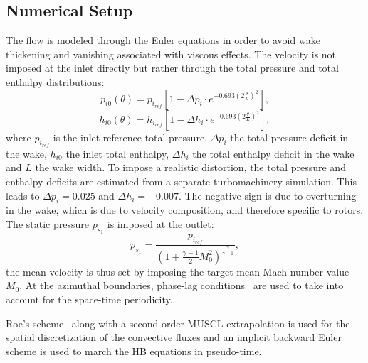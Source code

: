 \subsection{Numerical Setup}

The flow is modeled through the 
Euler equations in order to avoid wake thickening and vanishing
associated with viscous effects. 
The velocity is not imposed at the inlet directly
but rather through the total pressure and total enthalpy distributions:
\begin{equation}
  \label{eq:rotatingblocks_ptot}
    p_{i0} (\theta) = p_{i_{ref}} \left[1 - 
        \Delta p_i \cdot e^{
          -0.693 \left( 2 \frac{\theta}{L} \right) ^ 2}\right],
\end{equation}
\begin{equation}
  \label{eq:rotatingblocks_htot}
    h_{i0} (\theta) = h_{i_{ref}} \left[1- 
        \Delta h_i \cdot e^{
          -0.693 \left( 2 \frac{\theta}{L} \right) ^ 2}\right],
\end{equation}
where $p_{i_{ref}}$ is the inlet reference total pressure, $\Delta p_i$ the total pressure
deficit in the wake,
$h_{i0}$ the inlet total enthalpy, $\Delta h_i$ the total enthalpy
deficit in the wake and $L$ the wake width.
To impose a realistic distortion, the total pressure and
enthalpy deficits are estimated from a separate turbomachinery simulation.
This leads to $\Delta p_i = 0.025$ and 
$\Delta h_i = - 0.007$.
The negative sign is due to overturning in the wake, which
is due to velocity composition, and therefore specific to rotors.
The static pressure $p_{s_1}$ is imposed at the outlet:
\begin{equation}
    p_{s_1} = \frac{p_{i_{ref}}}{\left(1 + 
    \frac{\gamma - 1}{2} M_{0}^2 \right) ^ {\frac{\gamma}{ \gamma - 1}}} ,
\end{equation}
the mean velocity is thus set by imposing the
target mean Mach number value $M_{0}$.
At the azimuthal boundaries, phase-lag conditions~\cite{Erdos1977} 
are used to take into account for the space-time periodicity.

Roe's scheme~\cite{Roe1981} along with a second-order MUSCL extrapolation 
is used for the spatial discretization of
the convective fluxes and an implicit backward Euler scheme is used
to march the HB equations in pseudo-time.

